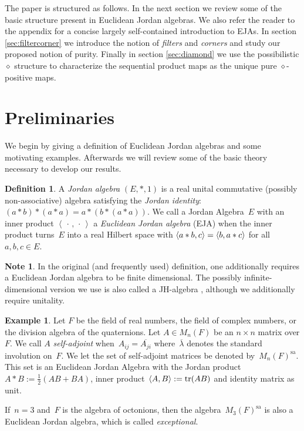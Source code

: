 \documentclass[submission,copyright,creativecommons]{eptcs}
\newcounter{main}
\theoremstyle{definition}
\newtheorem{definition}[main]{Definition}
\newtheorem{note}[main]{Note}
\newtheorem{example}[main]{Example}
\DeclarePairedDelimiter{\inn}{\langle}{\rangle}
\newcommand{\cl}[1]{\overline{#1}}
\newcommand{\sa}{\mathrm{sa}}
\begin{document}
The paper is structured as follows. In the next section we review
some of the basic structure present in Euclidean Jordan algebras.
We also refer the reader to the appendix for a concise largely self-contained
introduction to EJAs. In section \ref{sec:filtercorner} we introduce
the notion of \emph{filters} and \emph{corners} and study our
proposed notion of purity. Finally in section \ref{sec:diamond} we
use the possibilistic $\diamond$ structure to characterize the
sequential product maps as the unique pure $\diamond$-positive maps.

\section{Preliminaries}\label{sec:eja}
We begin by giving a definition of Euclidean Jordan algebras and
some motivating examples. Afterwards we will review some of the
basic theory necessary to develop our results.


\begin{definition}
	A \emph{Jordan algebra} $(E,*,1)$ is a real unital commutative
	(possibly non-associative) algebra satisfying the \emph{Jordan
	identity}: $(a*b)*(a*a) = a*(b*(a*a))$.
    We call a Jordan Algebra~$E$ with 
       an inner product $\left<\,\cdot\,,\,\cdot\,\right>$
        a \emph{Euclidean Jordan algebra} (EJA)
    when the inner product turns~$E$ into a real Hilbert space
	with
	$\inn{a*b,c}=\inn{b,a*c}$ for all~$a,b,c\in E$.
\end{definition}
\begin{note}
In the original (and frequently used) definition,
    one additionally requires a Euclidean Jordan algebra to be
    finite dimensional.
The possibly infinite-dimensional version we use
    is also called a JH-algebra \cite{chu2017infinite}, although we additionally require unitality.
\end{note}
\begin{example}
	Let $F$ be the field of real numbers, the field of complex numbers, or the division algebra of the quaternions. Let $A\in M_n(F)$ be an $n\times n$ matrix over $F$. We call $A$ \emph{self-adjoint}
    when~$A_{ij} = \cl{A_{ji}}$ where~$\cl{\lambda}$ denotes the
    standard involution on~$F$. We let the set of self-adjoint
    matrices be denoted by~$M_n(F)^\sa$. This set is an Euclidean Jordan Algebra
    with the Jordan product~$A*B:= \frac{1}{2}(AB+BA)$,
    inner product~$\inn{A,B}:= \tr(AB)$
    and identity matrix as unit.

    If~$n=3$ and~$F$ is the algebra of octonions,
        then the algebra~$M_3(F)^\sa$ is also
        a Euclidean Jordan algebra,
        which is called \emph{exceptional}.
\end{example}
\end{document}
